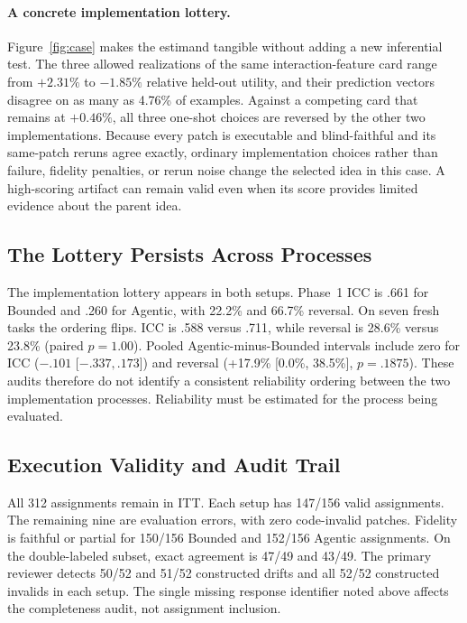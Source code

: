 \documentclass[letterpaper]{article}
\begin{document}
\paragraph{A concrete implementation lottery.}
Figure~\ref{fig:case} makes the estimand tangible without adding a new inferential test. The three allowed realizations of the same interaction-feature card range from $+2.31\%$ to $-1.85\%$ relative held-out utility, and their prediction vectors disagree on as many as 4.76\% of examples. Against a competing card that remains at $+0.46\%$, all three one-shot choices are reversed by the other two implementations. Because every patch is executable and blind-faithful and its same-patch reruns agree exactly, ordinary implementation choices rather than failure, fidelity penalties, or rerun noise change the selected idea in this case.
A high-scoring artifact can remain valid even when its score provides limited evidence about the parent idea.

\subsection{The Lottery Persists Across Processes}

The implementation lottery appears in both setups. Phase~1 ICC is .661 for Bounded and .260 for Agentic, with 22.2\% and 66.7\% reversal. On seven fresh tasks the ordering flips. ICC is .588 versus .711, while reversal is 28.6\% versus 23.8\% (paired $p=1.00$). Pooled Agentic-minus-Bounded intervals include zero for ICC ($-.101$ [$-.337,.173$]) and reversal (+17.9\% [0.0\%, 38.5\%], $p=.1875$). These audits therefore do not identify a consistent reliability ordering between the two implementation processes. Reliability must be estimated for the process being evaluated.

\subsection{Execution Validity and Audit Trail}

All 312 assignments remain in ITT. Each setup has 147/156 valid assignments. The remaining nine are evaluation errors, with zero code-invalid patches. Fidelity is faithful or partial for 150/156 Bounded and 152/156 Agentic assignments. On the double-labeled subset, exact agreement is 47/49 and 43/49. The primary reviewer detects 50/52 and 51/52 constructed drifts and all 52/52 constructed invalids in each setup. The single missing response identifier noted above affects the completeness audit, not assignment inclusion.
\end{document}
